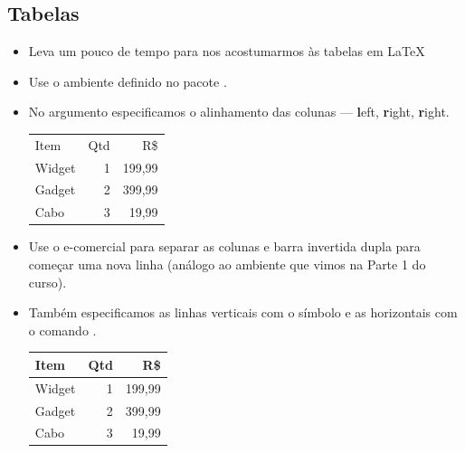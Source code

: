 \documentclass{beamer}
\begin{document}
\subsection{Tabelas}
\begin{frame}[fragile]{\insertsubsection}
	\begin{itemize}
		\item Leva um pouco de tempo para nos acostumarmos às tabelas em \LaTeX{} 
		\item Use o ambiente  definido no pacote .
		\item No argumento especificamos o alinhamento das colunas --- \textbf{l}eft, \textbf{r}ight, \textbf{r}ight.
		\begin{exampletwouptiny}
			\begin{tabular}{lrr}
				Item   & Qtd & R\$ \\
				Widget & 1   & 199,99  \\
				Gadget & 2   & 399,99  \\
				Cabo   & 3   & 19,99   \\
			\end{tabular}
		\end{exampletwouptiny}
		\item Use o e-comercial \keystrokebftt{\&} para separar as colunas e barra invertida dupla \keystrokebftt{\bs\bs} para começar uma nova linha (análogo ao ambiente  que vimos na Parte 1 do curso).

	\end{itemize}
\end{frame}

\begin{frame}[fragile]{\insertsubsection}
	\begin{itemize}
		\item Também especificamos as linhas verticais com o símbolo \keystrokebftt{|} e as horizontais com o comando .
		
		\begin{exampletwouptiny}
			\begin{tabular}{|l|r|r|} 	\hline
				Item   & Qtd & R\$ 		\\ \hline
				Widget & 1   & 199,99  	\\
				Gadget & 2   & 399,99  	\\
				Cabo   & 3   & 19,99   	\\ \hline
			\end{tabular}
		\end{exampletwouptiny}
	\end{itemize}
\end{frame}
\end{document}
